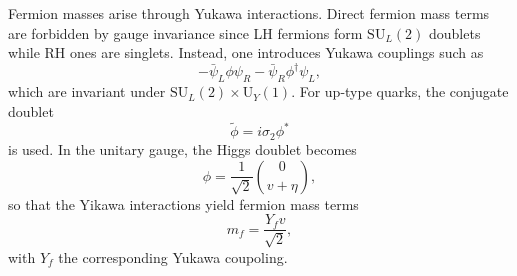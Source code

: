 Fermion masses arise through Yukawa interactions. Direct fermion mass terms are forbidden by gauge invariance since LH fermions form $\mathrm{SU}_L(2)$ doublets while RH ones are singlets. Instead, one introduces Yukawa couplings such as
\begin{equation}
-\bar{\psi}_L\phi\psi_R - \bar{\psi}_R\phi^\dagger\psi_L,
\end{equation}
which are invariant under $\mathrm{SU}_L(2) \times \mathrm{U}_Y(1)$. For up-type quarks, the conjugate doublet
\begin{equation}
\tilde{\phi}=i\sigma_2 \phi^*
\end{equation}
is used. In the unitary gauge, the Higgs doublet becomes
\begin{equation}
\phi = \frac{1}{\sqrt{2}}\binom{0}{v+\eta},
\end{equation}
so that the Yikawa interactions yield fermion mass terms
\begin{equation}
m_f= \frac{Y_f v}{\sqrt{2}},
\end{equation}
with $Y_f$ the corresponding Yukawa coupoling. 



  

  
